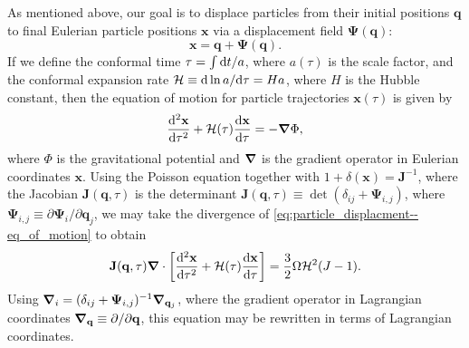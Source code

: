 As mentioned above, our goal is to displace particles from their initial positions $\mathbf{q}$ to final Eulerian particle positions $\mathbf{x}$ via a displacement field $\boldsymbol{\Psi}(\mathbf{q})$:
\begin{equation}
	\mathbf{x} = \mathbf{q} + \boldsymbol{\Psi}(\mathbf{q}).
\end{equation}
If we define the conformal time $\tau = \int {\rm {d}} t / a$, where $a(\tau)$ is the scale factor, and the conformal expansion rate $\mathcal{H} \equiv {\rm {d}} \ln a/{\rm {d}} \tau = H a$, where $H$ is the Hubble constant, then the equation of motion for particle trajectories $\mathbf{x}(\tau)$ is given by
\begin{equation} \label{eq:particle_displacment--eq_of_motion}
	\frac{{\rm {d}}^{2} \mathbf{x}}{{\rm {d}} \tau^{2}} + \mathcal{H}(\tau) \frac{{\rm {d}} \mathbf{x}}{{\rm {d}} \tau} = -{\boldsymbol{\nabla}} \Phi,
\end{equation}
where $\Phi$ is the gravitational potential and ${\boldsymbol{\nabla}}$ is the gradient operator in Eulerian coordinates $\mathbf{x}$.  Using the Poisson equation together with $1 + \delta(\mathbf{x}) = \mathbf{J}^{-1}$, where the Jacobian $\mathbf{J}(\mathbf{q}, \tau)$ is the determinant $\mathbf{J}(\mathbf{q}, \tau) \equiv \det(\delta_{ij} + \boldsymbol{\Psi}_{i,j})$, where $\boldsymbol{\Psi}_{i,j} \equiv \partial \boldsymbol{\Psi}_{i} / \partial \mathbf{q}_{j}$, we may take the divergence of \ref{eq:particle_displacment--eq_of_motion} to obtain
\begin{equation} \label{eq:particle_displacement--div_eq_of_motion}
	\mathbf{J}(\mathbf{q}, \tau) {\boldsymbol{\nabla}} \cdot \left[ \frac{{\rm {d}}^{2} \mathbf{x}}{{\rm {d}} \tau^{2}} + \mathcal{H}(\tau) \frac{{\rm {d}} \mathbf{x}}{{\rm {d}} \tau} \right]
	= \frac{3}{2} \Omega \mathcal{H}^{2}(J - 1).
\end{equation}
Using ${\boldsymbol{\nabla}}_{i} = (\delta_{ij} + \boldsymbol{\Psi}_{i,j})^{-1} {\boldsymbol{\nabla}}_{\mathbf{q}_{j}}$, where the gradient operator in Lagrangian coordinates ${\boldsymbol{\nabla}}_{\mathbf{q}} \equiv \partial / \partial \mathbf{q}$, this equation may be rewritten in terms of Lagrangian coordinates.

